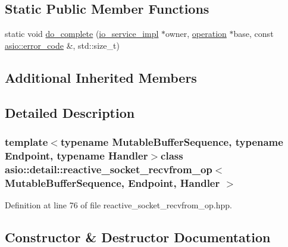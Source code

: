 \subsection*{Static Public Member Functions}
\begin{DoxyCompactItemize}
\item 
static void \hyperlink{classasio_1_1detail_1_1reactive__socket__recvfrom__op_a74da45f043b5c4ac7598633643be12f6}{do\+\_\+complete} (\hyperlink{namespaceasio_1_1detail_a6d61d9b8e53c11288be549d82aec5a42}{io\+\_\+service\+\_\+impl} $\ast$owner, \hyperlink{namespaceasio_1_1detail_a338968609bec20e37145309f8f9ec936}{operation} $\ast$base, const \hyperlink{classasio_1_1error__code}{asio\+::error\+\_\+code} \&, std\+::size\+\_\+t)
\end{DoxyCompactItemize}
\subsection*{Additional Inherited Members}


\subsection{Detailed Description}
\subsubsection*{template$<$typename Mutable\+Buffer\+Sequence, typename Endpoint, typename Handler$>$class asio\+::detail\+::reactive\+\_\+socket\+\_\+recvfrom\+\_\+op$<$ Mutable\+Buffer\+Sequence, Endpoint, Handler $>$}



Definition at line 76 of file reactive\+\_\+socket\+\_\+recvfrom\+\_\+op.\+hpp.



\subsection{Constructor \& Destructor Documentation}
\hypertarget{classasio_1_1detail_1_1reactive__socket__recvfrom__op_acd0c9e80cc507f518ed9bde6b8552aac}{}
